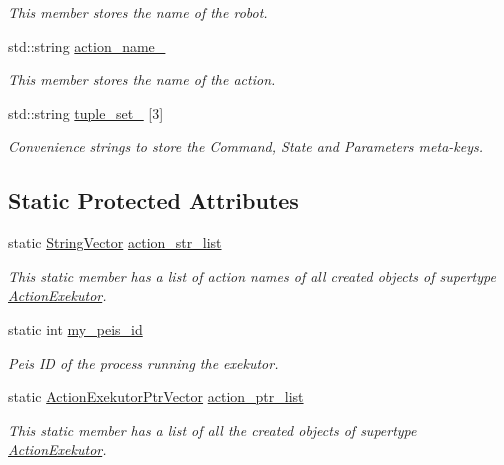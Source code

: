 \begin{DoxyCompactItemize}
\begin{DoxyCompactList}\small\item\em \-This member stores the name of the robot. \end{DoxyCompactList}\item 
std\-::string \hyperlink{classexekutor_1_1ActionExekutor_ad0ab1bb7a2575962ee5fc9e2150c5d50}{action\-\_\-name\-\_\-}
\begin{DoxyCompactList}\small\item\em \-This member stores the name of the action. \end{DoxyCompactList}\item 
std\-::string \hyperlink{classexekutor_1_1ActionExekutor_a4407dd299ca8494945da306b6a367108}{tuple\-\_\-set\-\_\-} \mbox{[}3\mbox{]}
\begin{DoxyCompactList}\small\item\em \-Convenience strings to store the \-Command, \-State and \-Parameters meta-\/keys. \end{DoxyCompactList}\end{DoxyCompactItemize}
\subsection*{\-Static \-Protected \-Attributes}
\begin{DoxyCompactItemize}
\item 
static \hyperlink{namespaceexekutor_a58d8a9cd227883a8eacb6400c9f62acb}{\-String\-Vector} \hyperlink{classexekutor_1_1ActionExekutor_a0dc39a7a2a3a67d2bdd366f9e6e682a2}{action\-\_\-str\-\_\-list}
\begin{DoxyCompactList}\small\item\em \-This static member has a list of action names of all created objects of supertype \hyperlink{classexekutor_1_1ActionExekutor}{\-Action\-Exekutor}. \end{DoxyCompactList}\item 
static int \hyperlink{classexekutor_1_1ActionExekutor_a31644a88e4d0166c2d3a70bab9eb5b99}{my\-\_\-peis\-\_\-id}
\begin{DoxyCompactList}\small\item\em \-Peis \-I\-D of the process running the exekutor. \end{DoxyCompactList}\item 
static \hyperlink{namespaceexekutor_a141a8f9a739e67ffb2356da18a653162}{\-Action\-Exekutor\-Ptr\-Vector} \hyperlink{classexekutor_1_1ActionExekutor_a73c4f2607b0725f5b201cf501cb42578}{action\-\_\-ptr\-\_\-list}
\begin{DoxyCompactList}\small\item\em \-This static member has a list of all the created objects of supertype \hyperlink{classexekutor_1_1ActionExekutor}{\-Action\-Exekutor}. \end{DoxyCompactList}\end{DoxyCompactItemize}


